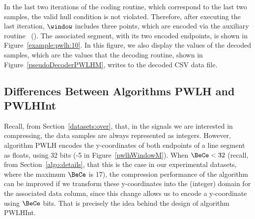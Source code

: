 \vspace{+5pt}


\clearpage


In the last two iterations of the coding routine, which correspond to the last two samples, the valid hull condition is not violated. Therefore, after executing the last iteration, $\window$ includes three points, which are encoded via the auxiliary routine \EncodeLastWindowPWLH\ (). The associated segment, with its two encoded endpoints, is shown in Figure~\ref{example:pwlh:10}. In this figure, we also display the values of the decoded samples, which are the values that the decoding routine, shown in Figure~\ref{pseudoDecoderPWLHM}, writes to the decoded CSV data file. 






\subsection{Differences Between Algorithms PWLH and PWLHInt}
\label{algo:pwhl:int}


Recall, from Section~\ref{datasets:over}, that, in the signals we are interested in compressing, the data samples are always represented as integers. However, algorithm PWLH \cite{coder:pwlh} encodes the y-coordinates of both endpoints of a line segment as floats, using 32 bits (-5 in Figure~\ref{pwlhWindowM}). When $\BeCe < 32$ (recall, from Section~\ref{algo:details}, that this is the case in our experimental datasets, where the maximum $\BeCe$ is 17), the compression performance of the algorithm can be improved if we transform these y-coordinates into the (integer) domain for the associated data column, since this change allows us to encode a y-coordinate using $\BeCe$ bits. That is precisely the idea behind the design of algorithm PWLHInt.


